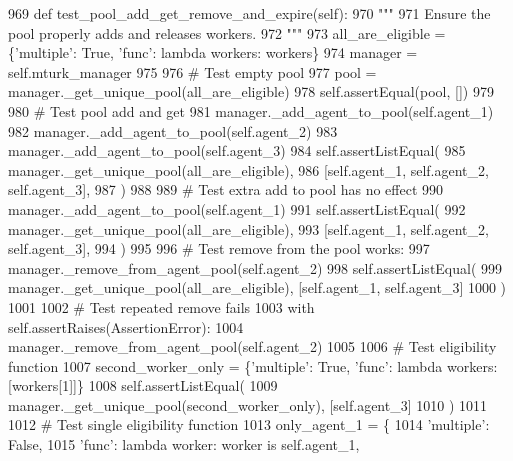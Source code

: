 \begin{DoxyCode}
969     \textcolor{keyword}{def }test\_pool\_add\_get\_remove\_and\_expire(self):
970         \textcolor{stringliteral}{"""}
971 \textcolor{stringliteral}{        Ensure the pool properly adds and releases workers.}
972 \textcolor{stringliteral}{        """}
973         all\_are\_eligible = \{\textcolor{stringliteral}{'multiple'}: \textcolor{keyword}{True}, \textcolor{stringliteral}{'func'}: \textcolor{keyword}{lambda} workers: workers\}
974         manager = self.mturk\_manager
975 
976         \textcolor{comment}{# Test empty pool}
977         pool = manager.\_get\_unique\_pool(all\_are\_eligible)
978         self.assertEqual(pool, [])
979 
980         \textcolor{comment}{# Test pool add and get}
981         manager.\_add\_agent\_to\_pool(self.agent\_1)
982         manager.\_add\_agent\_to\_pool(self.agent\_2)
983         manager.\_add\_agent\_to\_pool(self.agent\_3)
984         self.assertListEqual(
985             manager.\_get\_unique\_pool(all\_are\_eligible),
986             [self.agent\_1, self.agent\_2, self.agent\_3],
987         )
988 
989         \textcolor{comment}{# Test extra add to pool has no effect}
990         manager.\_add\_agent\_to\_pool(self.agent\_1)
991         self.assertListEqual(
992             manager.\_get\_unique\_pool(all\_are\_eligible),
993             [self.agent\_1, self.agent\_2, self.agent\_3],
994         )
995 
996         \textcolor{comment}{# Test remove from the pool works:}
997         manager.\_remove\_from\_agent\_pool(self.agent\_2)
998         self.assertListEqual(
999             manager.\_get\_unique\_pool(all\_are\_eligible), [self.agent\_1, self.agent\_3]
1000         )
1001 
1002         \textcolor{comment}{# Test repeated remove fails}
1003         with self.assertRaises(AssertionError):
1004             manager.\_remove\_from\_agent\_pool(self.agent\_2)
1005 
1006         \textcolor{comment}{# Test eligibility function}
1007         second\_worker\_only = \{\textcolor{stringliteral}{'multiple'}: \textcolor{keyword}{True}, \textcolor{stringliteral}{'func'}: \textcolor{keyword}{lambda} workers: [workers[1]]\}
1008         self.assertListEqual(
1009             manager.\_get\_unique\_pool(second\_worker\_only), [self.agent\_3]
1010         )
1011 
1012         \textcolor{comment}{# Test single eligibility function}
1013         only\_agent\_1 = \{
1014             \textcolor{stringliteral}{'multiple'}: \textcolor{keyword}{False},
1015             \textcolor{stringliteral}{'func'}: \textcolor{keyword}{lambda} worker: worker \textcolor{keywordflow}{is} self.agent\_1,

\end{DoxyCode}
